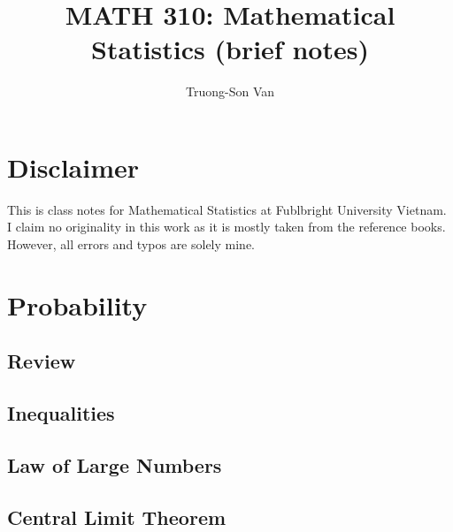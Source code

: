 \documentclass[
  openany]{book}
\title{MATH 310: Mathematical Statistics (brief notes)}
\author{Truong-Son Van}
\date{}
\begin{document}
\maketitle

{
\setcounter{tocdepth}{2}
\tableofcontents
}
\chapter*{Disclaimer}\label{disclaimer}


This is class notes for Mathematical Statistics at Fublbright University Vietnam.
I claim no originality in this work as it is mostly taken from the reference books.
However, all errors and typos are solely mine.

\newpage

\newcommand{\vectorproj}[2][]{\mathrm{proj}_{\vect{#1}}\vect{#2}}
\newcommand{\vectorcomp}[2][]{\mathrm{comp}_{\vect{#1}}\vect{#2}}
\newcommand{\vect}{\mathbf}
\newcommand{\R}{\mathbb{R}}

\chapter{Probability}\label{probability}

\section{Review}\label{review}

\section{Inequalities}\label{inequalities}

\section{Law of Large Numbers}\label{law-of-large-numbers}

\section{Central Limit Theorem}\label{central-limit-theorem}
\end{document}
